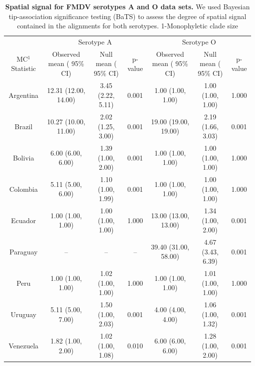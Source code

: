 \documentclass[a4paper,10pt]{article}
\begin{document}
\begin{table}
\caption{
\textbf{Spatial signal for FMDV serotypes A and O data sets.} We used Bayesian tip-association significance testing (BaTS) to assess the degree of spatial signal contained in the alignments for both serotypes. 1-Monophyletic clade size}
\begin{tabular}{ccccccc}
\toprule
&\multicolumn{3}{c}{Serotype A} & \multicolumn{3}{c}{Serotype O} \\
MC$^1$ Statistic &Observed mean ( 95\% CI)&Null mean ( 95\% CI)&p-value &Observed mean ( 95\% CI)&Null mean ( 95\% CI)&p-value\\
\midrule
Argentina &12.31 (12.00, 14.00)	&3.45	(2.22, 5.11)	&0.001& 1.00 (1.00, 1.00)&	1.00 (1.00, 1.00)&	1.000\\
Brazil &10.27	(10.00, 11.00)	&2.02 (1.25, 3.00) &0.001& 19.00 (19.00, 19.00)&	2.19 (1.66, 3.03)&	0.001\\
Bolivia &6.00 (6.00, 6.00)	&1.39 (1.00, 2.00)	&0.001&1.00 (1.00, 1.00)&	1.00 (1.00, 1.00)&	1.000\\
Colombia &5.11 (5.00, 6.00)	&1.10  (1.00, 1.99)	&0.001&1.00 (1.00, 1.00)&	1.00 (1.00, 1.00)&	1.000\\
Ecuador &1.00 (1.00, 1.00)	&1.00 (1.00, 1.00)	&1.000&13.00 (13.00, 13.00)&	1.34 (1.00, 2.00)&	0.001\\
Paraguay&-- &-- &--  & 39.40 (31.00, 58.00)& 4.67 (3.43, 6.39)&0.001\\
Peru&1.00 (1.00, 1.00)	&1.02 (1.00, 1.00)&1.000&1.00 (1.00, 1.00)&1.01 (1.00, 1.00)&1.000\\
Uruguay &5.11 (5.00, 7.00)	&1.50	(1.00, 2.03)	&0.001&4.00 (4.00, 4.00)&	1.06 (1.00, 1.32)&	0.001\\
Venezuela&1.82 (1.00, 2.00)	&1.02 (1.00, 1.08)	&0.010&6.00 (6.00, 6.00)&	1.28 (1.00, 2.00)&	0.001\\
\bottomrule
\end{tabular}
\begin{flushleft}
\end{flushleft}
\label{stab:BaTS}
\end{table}
\end{document}
